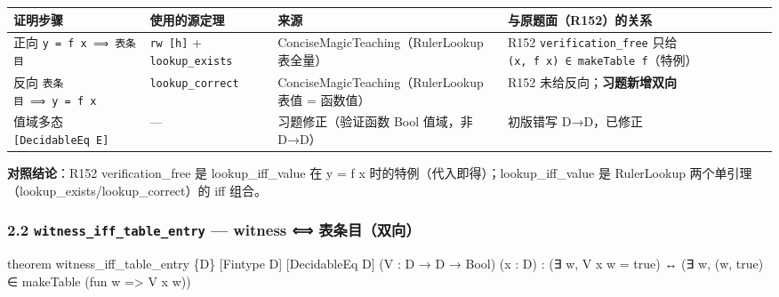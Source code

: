 \documentclass[
]{article}
\newenvironment{Shaded}{}{}
\newcommand{\NormalTok}[1]{#1}
\newcounter{none} %
\begin{document}
{\def\LTcaptype{none} %
\begin{longtable}[]{@{}
 >{\raggedright\arraybackslash}p{}
 >{\raggedright\arraybackslash}p{}
 >{\raggedright\arraybackslash}p{}
 >{\raggedright\arraybackslash}p{}@{}}
\toprule\noalign{}
\begin{minipage}[b]{\linewidth}\raggedright
证明步骤
\end{minipage} & \begin{minipage}[b]{\linewidth}\raggedright
使用的源定理
\end{minipage} & \begin{minipage}[b]{\linewidth}\raggedright
来源
\end{minipage} & \begin{minipage}[b]{\linewidth}\raggedright
与原题面（R152）的关系
\end{minipage} \\
\midrule\noalign{}
\endhead
\bottomrule\noalign{}
\endlastfoot
正向 \texttt{y\ =\ f\ x\ ⟹\ 表条目} & \texttt{rw\ {[}h{]}} +
\texttt{lookup\_exists} & ConciseMagicTeaching（RulerLookup 表全量） &
R152 \texttt{verification\_free} 只给
\texttt{(x,\ f\ x)\ ∈\ makeTable\ f}（特例） \\
反向 \texttt{表条目\ ⟹\ y\ =\ f\ x} & \texttt{lookup\_correct} &
ConciseMagicTeaching（RulerLookup 表值 = 函数值） & R152
未给反向；\textbf{习题新增双向} \\
值域多态 \texttt{{[}DecidableEq\ E{]}} & --- & 习题修正（验证函数 Bool
值域，非 D→D） & 初版错写 D→D，已修正 \\
\end{longtable}
}

\textbf{对照结论}：R152 verification\_free 是 lookup\_iff\_value 在 y =
f x 时的特例（代入即得）；lookup\_iff\_value 是 RulerLookup
两个单引理（lookup\_exists/lookup\_correct）的 iff 组合。

\subsubsection{\texorpdfstring{2.2 \texttt{witness\_iff\_table\_entry}
--- witness ⟺
表条目（双向）}{2.2 witness\_iff\_table\_entry --- witness ⟺ 表条目（双向）}}\label{witness_iff_table_entry-witness-ux8868ux6761ux76eeux53ccux5411}

\begin{Shaded}
\begin{Highlighting}[]
\NormalTok{theorem witness\_iff\_table\_entry \{D\} [Fintype D] [DecidableEq D]}
\NormalTok{ (V : D → D → Bool) (x : D) :}
\NormalTok{ (∃ w, V x w = true) ↔ (∃ w, (w, true) ∈ makeTable (fun w =\textgreater{} V x w))}
\end{Highlighting}
\end{Shaded}
\end{document}
